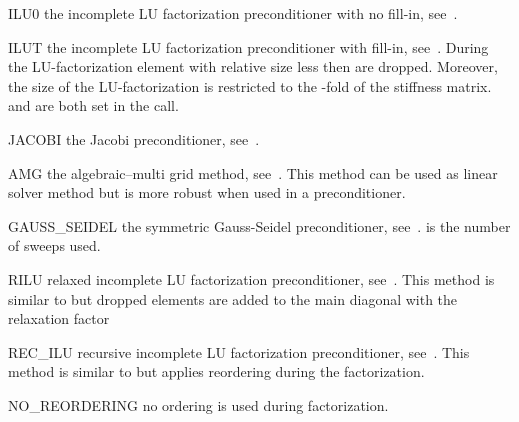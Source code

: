 \begin{memberdesc}[SolverOptions]{ILU0}
the incomplete LU factorization preconditioner with no fill-in, see~.
\end{memberdesc}

\begin{memberdesc}[SolverOptions]{ILUT}
the incomplete LU factorization preconditioner with fill-in, see~. During the  LU-factorization element with
relative size less then  are dropped. Moreover, the size of the LU-factorization is restricted to the
-fold of the stiffness matrix.  and  are both set in the
 call.
\end{memberdesc}

\begin{memberdesc}[SolverOptions]{JACOBI}
the Jacobi preconditioner, see~.
\end{memberdesc}


\begin{memberdesc}[SolverOptions]{AMG}
the algebraic--multi grid method, see~. This method can be used as linear solver method but is more robust when used
in a preconditioner.
\end{memberdesc}

\begin{memberdesc}[SolverOptions]{GAUSS_SEIDEL}
the symmetric Gauss-Seidel preconditioner, see~.
 is the number of sweeps used.
\end{memberdesc}

\begin{memberdesc}[SolverOptions]{RILU}
relaxed incomplete LU factorization preconditioner, see~. This method is similar to  but dropped elements are added to the main diagonal 
with the relaxation factor 
\end{memberdesc}

\begin{memberdesc}[SolverOptions]{REC_ILU}
recursive incomplete LU factorization preconditioner, see~. This method is similar to  but applies reordering during the factorization.
\end{memberdesc}

\begin{memberdesc}[SolverOptions]{NO_REORDERING}
no ordering is used during factorization.
\end{memberdesc}

